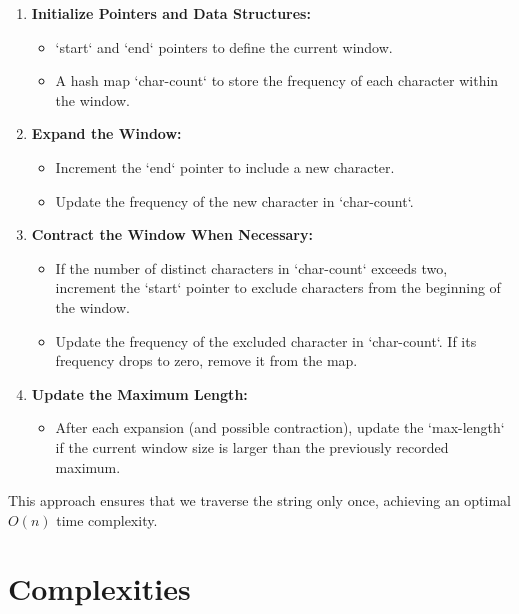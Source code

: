 \begin{enumerate}
    \item \textbf{Initialize Pointers and Data Structures:}
    \begin{itemize}
        \item `start` and `end` pointers to define the current window.
        \item A hash map `char-count` to store the frequency of each character within the window.
    \end{itemize}
    
    \item \textbf{Expand the Window:}
    \begin{itemize}
        \item Increment the `end` pointer to include a new character.
        \item Update the frequency of the new character in `char-count`.
    \end{itemize}
    
    \item \textbf{Contract the Window When Necessary:}
    \begin{itemize}
        \item If the number of distinct characters in `char-count` exceeds two, increment the `start` pointer to exclude characters from the beginning of the window.
        \item Update the frequency of the excluded character in `char-count`. If its frequency drops to zero, remove it from the map.
    \end{itemize}
    
    \item \textbf{Update the Maximum Length:}
    \begin{itemize}
        \item After each expansion (and possible contraction), update the `max-length` if the current window size is larger than the previously recorded maximum.
    \end{itemize}
\end{enumerate}

This approach ensures that we traverse the string only once, achieving an optimal \(O(n)\) time complexity.


\section*{Complexities}

